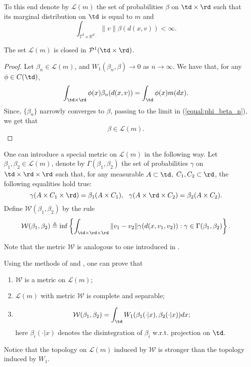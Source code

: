 \documentclass[12pt]{article}
\newcommand{\inttrd}{\int_{\mathbb{T}^d\times \mathbb{R}^d}}
\begin{document}
To this end denote by $\mathcal{L}(m)$ the set of probabilities $\beta$ on $\td\times \rd$ such that its marginal distribution on $\td$ is equal to $m$ and $$\inttrd\|v\|\beta(d(x,v))<\infty.$$ 
\begin{proposition} The set $\mathcal{L}(m)$ is  closed in $\mathcal{P}^1(\td\times\rd)$.
\end{proposition}
\begin{proof}
	Let $\beta_n\in\mathcal{L}(m)$, and $W_1(\beta_n,\beta)\rightarrow 0$ as $n\rightarrow \infty$. We have that, for any $\phi\in C(\td)$,
	\begin{equation}\label{equal:phi_beta_n}
	\int_{\td\times\rd}\phi(x)\beta_n(d(x,v))=\int_{\td}\phi(x)m(dx).
	\end{equation} Since, $\{\beta_n\}$ narrowly converges to $\beta$, passing to the limit in (\ref{equal:phi_beta_n}), we get that
	$$\beta\in \mathcal{L}(m). $$
\end{proof}

\begin{remark}
	One can introduce  a special  metric on $\mathcal{L}(m)$ in the following way. Let $\beta_1,\beta_2\in\mathcal{L}(m)$, denote by $\Gamma(\beta_1,\beta_2)$ the set of probabilities $\gamma$ on $\td\times \rd\times\rd$ such that, for any measurable $A\subset\td$, $C_1,C_2\subset\rd$, the following equalities hold true:
	$$\gamma(A\times C_1\times\rd)=\beta_1(A\times C_1),\ \     
	\gamma(A\times\rd\times C_2)=\beta_2(A\times C_2). $$
	Define $\mathcal{W}(\beta_1,\beta_2)$ by the rule
	\begin{equation}\label{intro:metric_beta}
	\mathcal{W}(\beta_1,\beta_2)\triangleq \inf\left\{\int_{\td\times \rd\times\rd}\|v_1-v_2\|\gamma(d(x,v_1,v_2)):\gamma\in \Gamma(\beta_1,\beta_2)\right\}.
	\end{equation}
	
	Note that the metric $\mathcal{W}$ is analogous to one introduced in \cite[Definition 5.1]{Gigli}.
	
	Using the  methods of \cite[Proposition 7.1.5]{Ambrosio} and \cite[Proposition 5.2]{Gigli}, one can prove that
	\begin{enumerate}
		\item 	$\mathcal{W}$ is a metric on $\mathcal{L}(m)$;
		\item $\mathcal{L}(m)$ with metric $\mathcal{W}$ is complete and separable;
		\item $$\mathcal{W}(\beta_1,\beta_2)=\int_{\td}W_1(\beta_1(\cdot|x),\beta_2(\cdot|x))dx; $$ here  $\beta_i(\cdot|x)$ denotes the disintegration of $\beta_i$ w.r.t. projection on $\td$.
	\end{enumerate}
	
	Notice that the topology on $\mathcal{L}(m)$ induced by $\mathcal{W}$ is stronger than the topology induced by $W_1$.
\end{remark}
\end{document}
